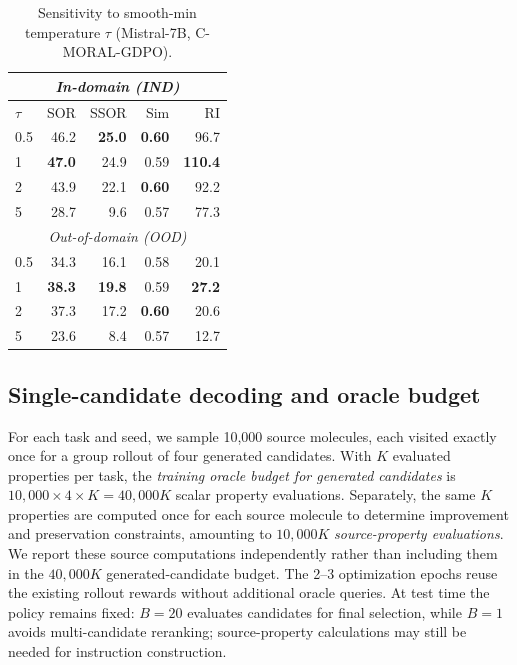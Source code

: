 \begin{table}[t]
\centering
\caption{Sensitivity to smooth-min temperature $\tau$ (Mistral-7B, C-MORAL-GDPO).}
\label{tab:tau_sensitivity}
\footnotesize
\setlength{\tabcolsep}{3pt}
\renewcommand{\arraystretch}{0.95}
\begin{tabular}{@{}lrrrr@{}}
\toprule
\multicolumn{5}{c}{\textit{In-domain (IND)}} \\
\midrule
$\tau$ & SOR & SSOR & Sim & RI \\
\midrule
0.5 & 46.2 & \textbf{25.0} & \textbf{0.60} & 96.7 \\
1 & \textbf{47.0} & 24.9 & 0.59 & \textbf{110.4} \\
2 & 43.9 & 22.1 & \textbf{0.60} & 92.2 \\
5 & 28.7 & 9.6 & 0.57 & 77.3 \\
\midrule
\multicolumn{5}{c}{\textit{Out-of-domain (OOD)}} \\
\midrule
0.5 & 34.3 & 16.1 & 0.58 & 20.1 \\
1 & \textbf{38.3} & \textbf{19.8} & 0.59 & \textbf{27.2} \\
2 & 37.3 & 17.2 & \textbf{0.60} & 20.6 \\
5 & 23.6 & 8.4 & 0.57 & 12.7 \\
\bottomrule
\end{tabular}
\end{table}

\subsection{Single-candidate decoding and oracle budget}
\label{appendix:oracle_budget}
For each task and seed, we sample 10,000 source molecules, each visited exactly once for a group rollout of four generated candidates. With $K$ evaluated properties per task, the \emph{training oracle budget for generated candidates} is $10{,}000\times4\times K=40{,}000K$ scalar property evaluations. Separately, the same $K$ properties are computed once for each source molecule to determine improvement and preservation constraints, amounting to $10{,}000K$ \emph{source-property evaluations}. We report these source computations independently rather than including them in the $40{,}000K$ generated-candidate budget. The 2--3 optimization epochs reuse the existing rollout rewards without additional oracle queries. At test time the policy remains fixed: $B=20$ evaluates candidates for final selection, while $B=1$ avoids multi-candidate reranking; source-property calculations may still be needed for instruction construction.

